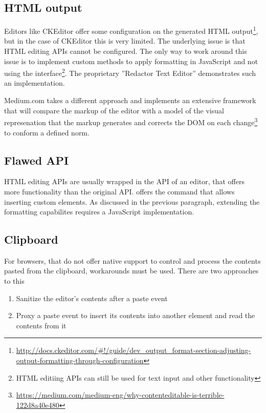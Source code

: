 \subsection{HTML output} 
\label{subsec:treating_issues_first}

Editors like CKEditor offer some configuration on the generated HTML output\footnote{\url{http://docs.ckeditor.com/\#!/guide/dev\_output\_format-section-adjusting-output-formatting-through-configuration}}, but in the case of CKEditor this is very limited. The underlying issue is that HTML editing APIs cannot be configured. The only way to work around this issue is to implement custom methods to apply formatting in JavaScript and not using the  interface\footnote{HTML editiing APIs can still be used for text input and other functionality}. The proprietary ''Redactor Text Editor'' demonstrates such an implementation.

Medium.com takes a different approach and implements an extensive framework that will compare the markup of the editor with a model of the visual represenation that the markup generates and corrects the DOM on each change\footnote{\url{https://medium.com/medium-eng/why-contenteditable-is-terrible-122d8a40e480}} to conform a defined norm.

\subsection{Flawed API}

HTML editing APIs are usually wrapped in the API of an editor, that offers more functionality than the original API.  offers the  command that allows inserting custom elements. As discussed in the previous paragraph, extending the formatting capabilites requires a JavaScript implementation.

\subsection{Clipboard}

For browsers, that do not offer native support to control and process the contents pasted from the clipboard, workarounds must be used. There are two approaches to this

\begin{enumerate}
\item Sanitize the editor's contents after a paste event
\item Proxy a paste event to insert its contents into another element and read the contents from it
\end{enumerate}

